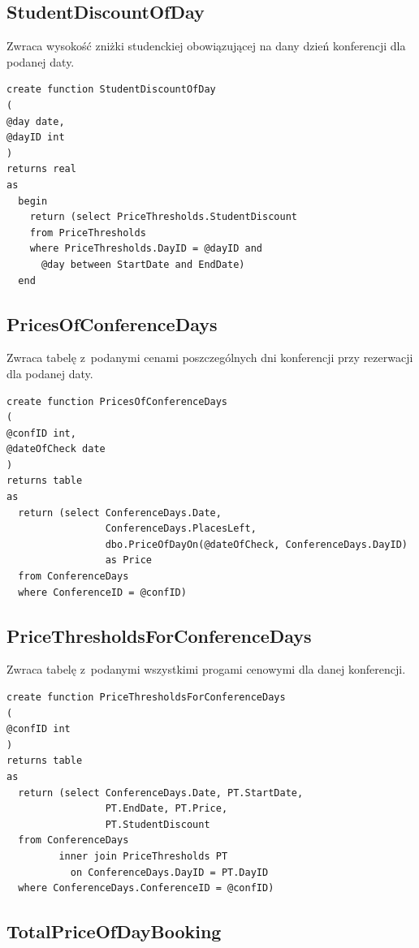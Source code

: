 \documentclass[12pt, a4paper]{mwrep}
\begin{document}
\subsection{StudentDiscountOfDay}

\noindent Zwraca wysokość zniżki studenckiej obowiązującej na dany dzień konferencji dla podanej daty.

\begin{lstlisting}
create function StudentDiscountOfDay
(
@day date,
@dayID int
)
returns real
as
  begin
    return (select PriceThresholds.StudentDiscount
    from PriceThresholds
    where PriceThresholds.DayID = @dayID and 
      @day between StartDate and EndDate)
  end
\end{lstlisting}

\subsection{PricesOfConferenceDays}

\noindent Zwraca tabelę z~podanymi cenami poszczególnych dni konferencji przy rezerwacji dla podanej daty.

\begin{lstlisting}
create function PricesOfConferenceDays
(
@confID int,
@dateOfCheck date
)
returns table
as
  return (select ConferenceDays.Date, 
                 ConferenceDays.PlacesLeft, 
                 dbo.PriceOfDayOn(@dateOfCheck, ConferenceDays.DayID) 
                 as Price
  from ConferenceDays
  where ConferenceID = @confID)
\end{lstlisting}

\subsection{PriceThresholdsForConferenceDays}

\noindent Zwraca tabelę z~podanymi wszystkimi progami cenowymi dla danej konferencji.

\begin{lstlisting}
create function PriceThresholdsForConferenceDays
(
@confID int
)
returns table
as
  return (select ConferenceDays.Date, PT.StartDate, 
                 PT.EndDate, PT.Price, 
                 PT.StudentDiscount
  from ConferenceDays
         inner join PriceThresholds PT
           on ConferenceDays.DayID = PT.DayID
  where ConferenceDays.ConferenceID = @confID)
\end{lstlisting}

\subsection{TotalPriceOfDayBooking}
\end{document}
